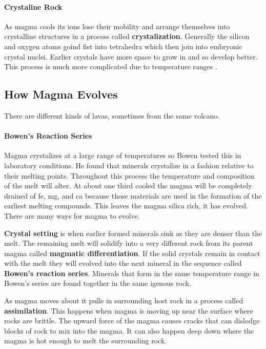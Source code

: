 \documentclass{article}
\begin{document}
\paragraph{Crystaline Rock} %
\label{par:crystaline_rock}
As magma cools its ions lose their mobility and arrange themselves into crystalline structures in a process called \textbf{crystalization}. Generally the silicon and oxygen atoms goind fist into tetrahedra which then join into embryonic crystal nuclei. Earlier crystals have more space to grow in and so develop better. This process is much more complicated due to temperature ranges .

\subsection{How Magma Evolves} %
\label{sub:how_magma_evolves}
There are different kinds of lavas, sometimes from the same volcano.

\paragraph{Bowen's Reaction Series} %
\label{par:bowen_s_reaction_series}
Magma crystalizes at a large range of temperatures so Bowen tested this in laboratory conditions. He found that minerals crystalize in a fashion relative to their melting points. Throughout this process the temperature and composition of the melt will alter. At about one third cooled the magma will be completely drained of fe, mg, and ca because those materials are used in the formation of the earliest melting compounds. This leaves the magma silica rich, it has evolved. There are many ways for magma to evolve.

\textbf{Crystal setting} is when earlier formed minerals sink as they are denser than the melt. The remaining melt will solidify into a very different rock from its parent magma called \textbf{magmatic differentiation}. If the solid crystals remain in contact with the melt they will evolved into the next mineral in the sequence called \textbf{Bowen's reaction series}. Minerals that form in the same temperature range in Bowen's series  are found together in the same igenous rock.

As magma moves about it pulls in surrounding host rock in a process called \textbf{assimilation}. This happens when magma is moving up near the surface where rocks are brittle. The upward force of the magma causes cracks that can dislodge blocks of rock to mix into the magma. It can also happen deep down where the magma is hot enough to melt the surrounding rock.
\end{document}
